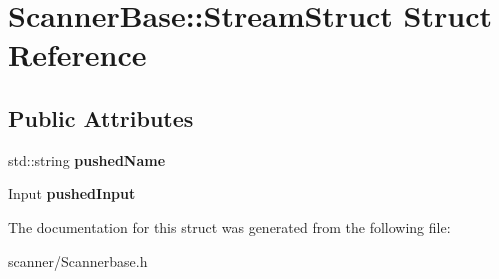 \hypertarget{structScannerBase_1_1StreamStruct}{\section{Scanner\+Base\+:\+:Stream\+Struct Struct Reference}
\label{structScannerBase_1_1StreamStruct}
}
\subsection*{Public Attributes}
\begin{DoxyCompactItemize}
\item 
\hypertarget{structScannerBase_1_1StreamStruct_a890dab2308ed9ceb65355336397fe0b3}{std\+::string {\bfseries pushed\+Name}}\label{structScannerBase_1_1StreamStruct_a890dab2308ed9ceb65355336397fe0b3}

\item 
\hypertarget{structScannerBase_1_1StreamStruct_a188ad02b8ba4d1442f21a100dcd3ea63}{Input {\bfseries pushed\+Input}}\label{structScannerBase_1_1StreamStruct_a188ad02b8ba4d1442f21a100dcd3ea63}

\end{DoxyCompactItemize}


The documentation for this struct was generated from the following file\+:\begin{DoxyCompactItemize}
\item 
scanner/Scannerbase.\+h\end{DoxyCompactItemize}
